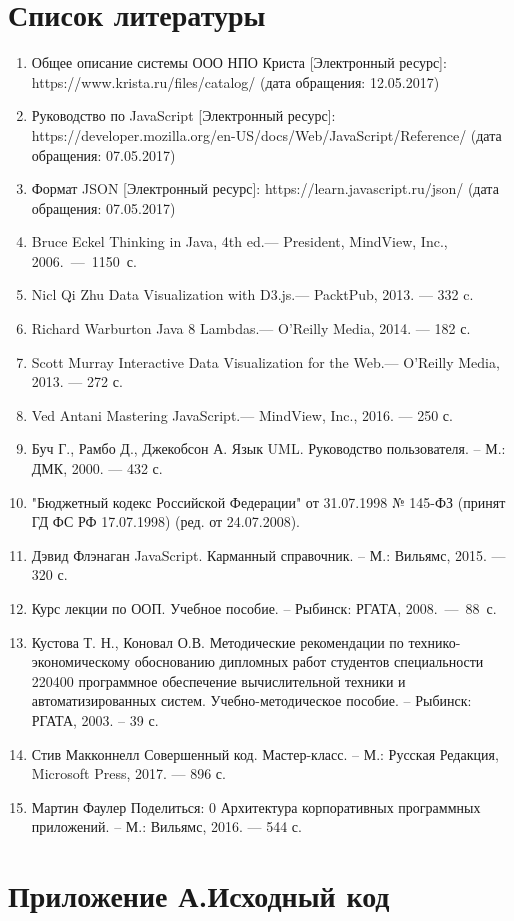 \documentclass[a4paper]{extarticle}
\numberwithin{equation}{section}
\begin{document}
\newpage
\section*{Список литературы}
\begin{enumerate}
\item Общее описание системы ООО НПО Криста [Электронный ресурс]: https://www.krista.ru/files/catalog/ (дата обращения: 12.05.2017)
\item Руководство по JavaScript [Электронный ресурс]: https://developer.mozilla.org/en-US/docs/Web/JavaScript/Reference/ (дата обращения: 07.05.2017)
\item Формат JSON [Электронный ресурс]: https://learn.javascript.ru/json/ (дата обращения: 07.05.2017)
\item Bruce Eckel Thinking in Java, 4th ed.— President, MindView, Inc., 2006.~—~1150~с.
\item Nicl Qi Zhu Data Visualization with D3.js.— PacktPub, 2013. — 332 c.
\item Richard Warburton Java 8 Lambdas.— O'Reilly Media, 2014. — 182 с.
\item Scott Murray Interactive Data Visualization for the Web.— O'Reilly Media, 2013. — 272 с.
\item Ved Antani Mastering JavaScript.— MindView, Inc., 2016. — 250 с.
\item Буч Г., Рамбо Д., Джекобсон А. Язык UML. Руководство пользователя. – М.: ДМК, 2000. — 432 с.
\item "Бюджетный кодекс Российской Федерации" от 31.07.1998 № 145-ФЗ (принят ГД ФС РФ 17.07.1998) (ред. от 24.07.2008).
\item Дэвид Флэнаган JavaScript. Карманный справочник. – М.: Вильямс, 2015. — 320 с.
\item Курс лекции по ООП. Учебное пособие. – Рыбинск: РГАТА, 2008.~—~88~с.
\item Кустова Т. Н., Коновал О.В. Методические рекомендации по технико- экономическому обоснованию дипломных работ студентов специальности 220400 программное обеспечение вычислительной техники и автоматизированных систем. Учебно-методическое пособие. – Рыбинск: РГАТА, 2003. – 39 с.
\item Стив Макконнелл Совершенный код. Мастер-класс. – М.: Русская Редакция, Microsoft Press, 2017. — 896 с.
\item Мартин Фаулер Поделиться: 0 Архитектура корпоративных программных приложений. – М.: Вильямс, 2016. — 544 с.
\end{enumerate}

\newpage
\section*{Приложение А.Исходный код}


\end{document}
